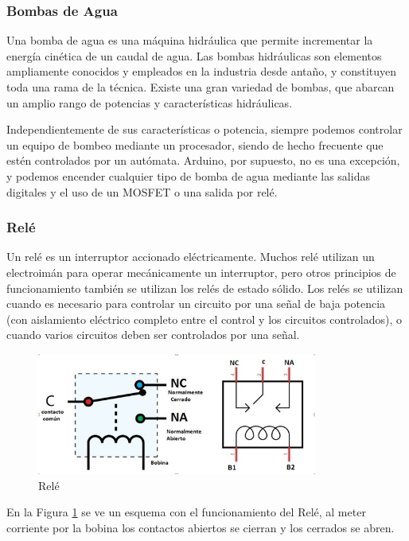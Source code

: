 \documentclass[a4paper]{article}
\begin{document}
\subsubsection*{Bombas de Agua}

Una bomba de agua es una máquina hidráulica que permite incrementar 
la energía cinética de un caudal de agua. Las bombas hidráulicas son 
elementos ampliamente conocidos y empleados
 en la industria desde antaño, y constituyen toda una rama de la 
 técnica. Existe una gran variedad de bombas, que abarcan un amplio 
 rango de potencias y características hidráulicas.

Independientemente de sus características o potencia, siempre podemos 
controlar un equipo de bombeo mediante un procesador, siendo de hecho 
frecuente que estén controlados por un autómata. Arduino, por 
supuesto, no es una excepción, y podemos encender cualquier tipo de 
bomba de agua mediante las salidas digitales y el uso de un MOSFET o 
una salida por relé.

\subsubsection*{Relé}

Un relé es un interruptor accionado eléctricamente. Muchos relé 
utilizan un electroimán para operar mecánicamente un interruptor, 
pero otros principios de funcionamiento también se utilizan los 
relés de estado sólido. Los relés se utilizan cuando es necesario 
para controlar un circuito por una señal de baja potencia (con 
aislamiento eléctrico completo entre el control y los circuitos 
controlados), o cuando varios circuitos deben ser controlados por 
una señal.

\begin{figure}[h]\centering
    \includegraphics[height=4cm]{rele.png}
    \caption{Relé}
    \label{fig:Rele}
\end{figure}

En la Figura \ref{fig:Rele} se ve un esquema con el funcionamiento 
del Relé, al meter corriente por la bobina los contactos abiertos 
se cierran y los cerrados se abren.
\end{document}
